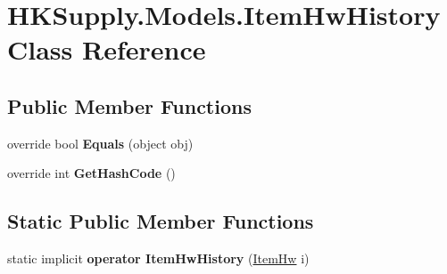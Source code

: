 \hypertarget{class_h_k_supply_1_1_models_1_1_item_hw_history}{}\section{H\+K\+Supply.\+Models.\+Item\+Hw\+History Class Reference}
\label{class_h_k_supply_1_1_models_1_1_item_hw_history}
\subsection*{Public Member Functions}
\begin{DoxyCompactItemize}
\item 
\mbox{\label{class_h_k_supply_1_1_models_1_1_item_hw_history_a67d6f9ed1a5509bbef05b38e3978eaab}} 
override bool {\bfseries Equals} (object obj)
\item 
\mbox{\label{class_h_k_supply_1_1_models_1_1_item_hw_history_aaad805958d10dec3eb6bbf83a9a1259c}} 
override int {\bfseries Get\+Hash\+Code} ()
\end{DoxyCompactItemize}
\subsection*{Static Public Member Functions}
\begin{DoxyCompactItemize}
\item 
\mbox{\label{class_h_k_supply_1_1_models_1_1_item_hw_history_abd152148540941ecfd2387128c95ecbc}} 
static implicit {\bfseries operator Item\+Hw\+History} (\mbox{\hyperlink{class_h_k_supply_1_1_models_1_1_item_hw}{Item\+Hw}} i)
\end{DoxyCompactItemize}
